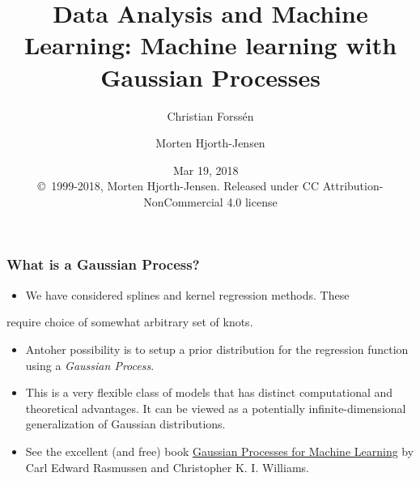 \documentclass{beamer}
\begin{document}

\newcommand{\exercisesection}[1]{\subsection*{#1}}







\title{Data Analysis and Machine Learning: Machine learning with Gaussian Processes}


\author{Christian Forssén
\and
Morten Hjorth-Jensen}

\date{Mar 19, 2018
\ \\ 
{\tiny \copyright\ 1999-2018, Morten Hjorth-Jensen. Released under CC Attribution-NonCommercial 4.0 license}
}

\begin{frame}
\titlepage
\end{frame}

\begin{frame}
\frametitle{What is a Gaussian Process?}

\begin{itemize}
\item We have considered splines and kernel regression methods. These
\end{itemize}

\noindent
require choice of somewhat arbitrary set of knots.

\begin{itemize}
\item Antoher possibility is to setup a prior distribution for the
  regression function using a \emph{Gaussian Process}.

\item This is a very flexible class of models that has distinct computational
  and theoretical advantages. It can be viewed as a potentially
  infinite-dimensional generalization of Gaussian distributions.

\item See the excellent (and free) book \href{{http://www.gaussianprocess.org/gpml/}}{Gaussian Processes for Machine
  Learning} by Carl Edward
  Rasmussen and Christopher K. I. Williams. 
\end{itemize}

\noindent
\end{frame}
\end{document}
